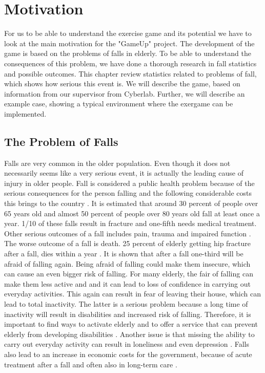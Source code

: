 \chapter{Motivation}
For us to be able to understand the exercise game and its potential we have to look at the main motivation for the "GameUp" project. The development of the game is based on the problems of falls in elderly. To be able to understand the consequences of this problem, we have done a thorough research in fall statistics and possible outcomes. This chapter review statistics related to problems of fall, which shows how serious this event is. We will describe the game, based on information from our supervisor from Cyberlab. Further, we will describe an example case, showing a typical environment where the exergame can be implemented.  
\section{The Problem of Falls}
Falls are very common in the older population. Even though it does not necessarily seems like a very serious event, it is actually the leading cause of injury in older people.  Fall is considered a public health problem because of the serious consequences for the person falling and the following considerable costs this brings to the country \cite{otago}.
It is estimated that around 30 percent of people over 65 years old and almost 50 percent of people over 80 years old fall at least once a year. 1/10 of these falls result in fracture and one-fifth needs medical treatment. Other serious outcomes of a fall includes pain, trauma and impaired function \cite{otago}.  The worse outcome of a fall is death. 25 percent of elderly getting hip fracture after a fall, dies within a year \cite{gruppetrening-trheim} \cite{larhalsbrudd}. It is shown that after a fall one-third will be afraid of falling again. Being afraid of falling could make them insecure, which can cause an even bigger risk of falling. For many elderly, the fair of falling can make them less active and and it can lead to loss of confidence in carrying out everyday activities. This again can result in fear of leaving their house, which can lead to total inactivity. The latter is a serious problem because a long time of inactivity will result in disabilities and increased risk of falling. Therefore, it is important to find ways to activate elderly and to offer a service that can prevent elderly from developing disabilities \cite{gruppetrening-trheim}. Another issue is that missing the ability to carry out everyday activity can result in loneliness and even depression \cite{exergamesforelderly}. Falls also lead to an increase in economic costs for the government, because of acute treatment after a fall and often also in long-term care \cite{otago}.\\ \\


